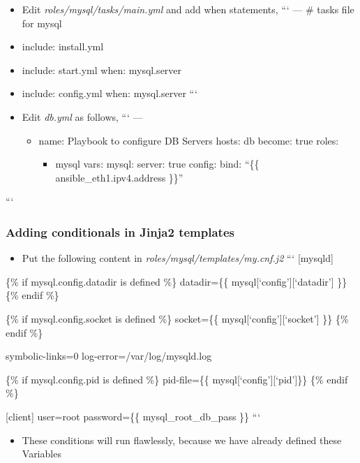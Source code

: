 \begin{itemize}
\item Edit \emph{roles/mysql/tasks/main.yml} and add when statements,\newline
  ```
  ---
  \# tasks file for mysql
\item include: install.yml
\item include: start.yml
when: mysql.server
\item include: config.yml
when: mysql.server
  ```  
\item Edit \emph{db.yml} as follows,
  ```
  ---


\begin{itemize}
\item name: Playbook to configure DB Servers
hosts: db
become: true
roles:


\begin{itemize}
\item mysql
vars:
mysql:
  server: true
  config:
    bind: ``\{\{ ansible\_eth1.ipv4.address \}\}''
\end{itemize}
\end{itemize}
\end{itemize}

```  

\subsubsection{Adding conditionals in Jinja2 templates}

\begin{itemize}
\item Put the following content in \emph{roles/mysql/templates/my.cnf.j2}\newline
  ```
  [mysqld]
\end{itemize}

\{\% if mysql.config.datadir is defined \%\}
  datadir=\{\{ mysql[`config'][`datadir'] \}\}
  \{\% endif \%\}

\{\% if mysql.config.socket is defined \%\}
  socket=\{\{ mysql[`config'][`socket'] \}\}
  \{\% endif \%\}

symbolic-links=0
  log-error=/var/log/mysqld.log

\{\% if mysql.config.pid is defined \%\}
  pid-file=\{\{ mysql[`config'][`pid']\}\}
  \{\% endif \%\}

[client]
  user=root
  password=\{\{ mysql\_root\_db\_pass \}\}
  ```  

\begin{itemize}
\item These conditions will run flawlessly, because we have already defined these Variables
\end{itemize}

